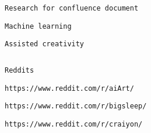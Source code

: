  
 
  \protect\hypertarget{ID_319428621}{}{}

\begin{verbatim}
Research for confluence document
\end{verbatim}

   
   
    \protect\hypertarget{ID_662139025}{}{}

\begin{verbatim}
Machine learning
\end{verbatim}

     
     
      \protect\hypertarget{ID_891377503}{}{}

\begin{verbatim}
Assisted creativity
\end{verbatim}

       
       
        \protect\hypertarget{ID_235056889}{}{}

\begin{verbatim}
\end{verbatim}
       

       
       
        \protect\hypertarget{ID_835669527}{}{}

\begin{verbatim}
Reddits
\end{verbatim}

         
         
          \protect\hypertarget{ID_492566721}{}{}

\begin{verbatim}
https://www.reddit.com/r/aiArt/
\end{verbatim}
         

         
         
          \protect\hypertarget{ID_147265985}{}{}

\begin{verbatim}
https://www.reddit.com/r/bigsleep/
\end{verbatim}
         

         
         
          \protect\hypertarget{ID_655112575}{}{}

\begin{verbatim}
https://www.reddit.com/r/craiyon/
\end{verbatim}
         

